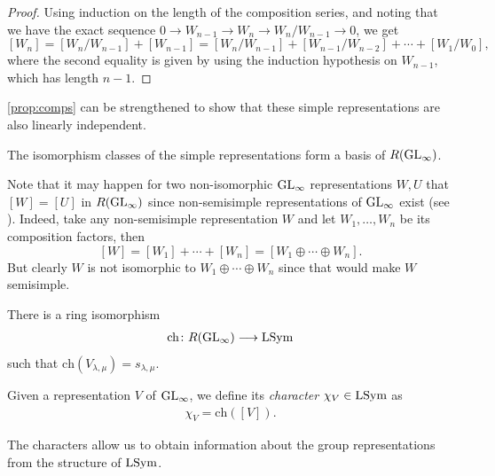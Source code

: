 \documentclass[11pt]{amsart}
\begin{document}
\begin{proof}
    Using induction on the length of the composition series, and noting that we have the exact sequence \(0 \to W_{n - 1} \to W_n \to W_n/W_{n - 1} \to 0\),
    we get
    \[[W_n] = [W_n/W_{n -1}] + [W_{n - 1}]  =   [W_n/W_{n -1}] + [W_{n - 1}/W_{n - 2}] + \cdots + [W_1/W_0],\]
   where the second equality is given by using the induction hypothesis on \(W_{n -1}\), which has length \(n - 1\).
\end{proof}

\cref{prop:comps} can be strengthened to show that these simple representations are also linearly independent.

\begin{prop}
    The isomorphism classes of the simple representations form a basis of \(R(\mathrm{GL}_\infty)\).
\end{prop}

    Note that it may happen for two non-isomorphic \(\mathrm{GL}_\infty\) representations \(W,U\) that \([W] = [U]\) in \(R(\mathrm{GL}_\infty)\) since non-semisimple representations of $\mathrm{GL}_\infty$ exist (see \cite[1.2.2]{SS15}). Indeed, take any non-semisimple representation \(W\) and let \(W_1,\dots,W_n\) be its composition factors, then
\[
[W] = [W_1] + \cdots + [W_n] = [W_1 \oplus \cdots \oplus W_n].
\]
But clearly \(W\) is not isomorphic to \(W_1 \oplus \cdots \oplus W_n\) since that would make \(W\) semisimple.

\begin{theo}
There is a ring isomorphism
\begin{align*}
    \mathrm{ch}\colon R(\mathrm{GL}_\infty) \longrightarrow \mathrm{LSym}
\end{align*}
such that \(\mathrm{ch}(V_{\lambda,\mu}) = s_{\lambda, \mu}\). 
\end{theo}

\begin{defin} Given a representation \(V\) of \(\mathrm{GL}_\infty\), we define its \emph{character} \(\chi_V \in \mathrm{LSym}\) as
\begin{align}
    \chi_V = \mathrm{ch}([V]).
\end{align}
\end{defin}


The characters allow us to obtain information about the group representations from the structure of \(\mathrm{LSym}\). 
\end{document}

